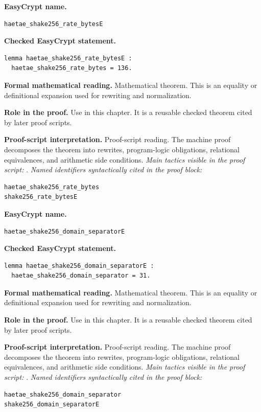 \begin{formaltheorem}
\noindent\textbf{EasyCrypt name.}
\begin{lstlisting}[language=EasyCrypt,basicstyle=\ttfamily\scriptsize]
haetae_shake256_rate_bytesE
\end{lstlisting}
\noindent\textbf{Checked EasyCrypt statement.}
\begin{lstlisting}[language=EasyCrypt,basicstyle=\ttfamily\scriptsize]
lemma haetae_shake256_rate_bytesE :
  haetae_shake256_rate_bytes = 136.
\end{lstlisting}
\noindent\textbf{Formal mathematical reading.}
Mathematical theorem. This is an equality or definitional expansion used for rewriting and normalization.

\noindent\textbf{Role in the proof.}
Use in this chapter. It is a reusable checked theorem cited by later proof scripts.

\noindent\textbf{Proof-script interpretation.}
Proof-script reading. The machine proof decomposes the theorem into rewrites, program-logic obligations, relational equivalences, and arithmetic side conditions.
\emph{Main tactics visible in the proof script:} .
\emph{Named identifiers syntactically cited in the proof block:}
\begin{lstlisting}[language=EasyCrypt,basicstyle=\ttfamily\scriptsize]
haetae_shake256_rate_bytes
shake256_rate_bytesE
\end{lstlisting}

\end{formaltheorem}

\begin{formaltheorem}
\noindent\textbf{EasyCrypt name.}
\begin{lstlisting}[language=EasyCrypt,basicstyle=\ttfamily\scriptsize]
haetae_shake256_domain_separatorE
\end{lstlisting}
\noindent\textbf{Checked EasyCrypt statement.}
\begin{lstlisting}[language=EasyCrypt,basicstyle=\ttfamily\scriptsize]
lemma haetae_shake256_domain_separatorE :
  haetae_shake256_domain_separator = 31.
\end{lstlisting}
\noindent\textbf{Formal mathematical reading.}
Mathematical theorem. This is an equality or definitional expansion used for rewriting and normalization.

\noindent\textbf{Role in the proof.}
Use in this chapter. It is a reusable checked theorem cited by later proof scripts.

\noindent\textbf{Proof-script interpretation.}
Proof-script reading. The machine proof decomposes the theorem into rewrites, program-logic obligations, relational equivalences, and arithmetic side conditions.
\emph{Main tactics visible in the proof script:} .
\emph{Named identifiers syntactically cited in the proof block:}
\begin{lstlisting}[language=EasyCrypt,basicstyle=\ttfamily\scriptsize]
haetae_shake256_domain_separator
shake256_domain_separatorE
\end{lstlisting}

\end{formaltheorem}

